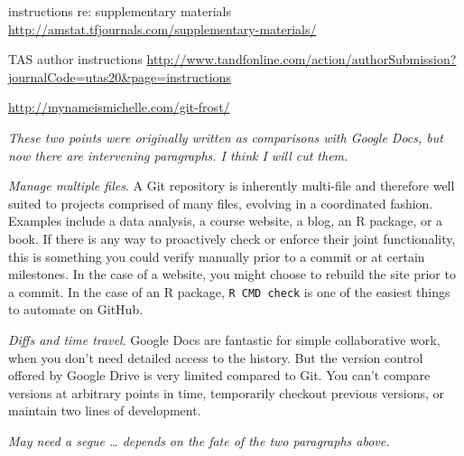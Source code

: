 \documentclass[12pt]{article}
\begin{document}
instructions re: supplementary materials
\url{http://amstat.tfjournals.com/supplementary-materials/}

TAS author instructions
\url{http://www.tandfonline.com/action/authorSubmission?journalCode=utas20\&page=instructions}

\url{http://mynameismichelle.com/git-frost/}

\emph{These two points were originally written as comparisons with
Google Docs, but now there are intervening paragraphs. I think I will
cut them.}

\emph{Manage multiple files}. A Git repository is inherently multi-file
and therefore well suited to projects comprised of many files, evolving
in a coordinated fashion. Examples include a data analysis, a course
website, a blog, an R package, or a book. If there is any way to
proactively check or enforce their joint functionality, this is
something you could verify manually prior to a commit or at certain
milestones. In the case of a website, you might choose to rebuild the
site prior to a commit. In the case of an R package,
\texttt{R\ CMD\ check} is one of the easiest things to automate on
GitHub.

\emph{Diffs and time travel}. Google Docs are fantastic for simple
collaborative work, when you don't need detailed access to the history.
But the version control offered by Google Drive is very limited compared
to Git. You can't compare versions at arbitrary points in time,
temporarily checkout previous versions, or maintain two lines of
development.

\emph{May need a segue \ldots{} depends on the fate of the two
paragraphs above.}



\end{document}
